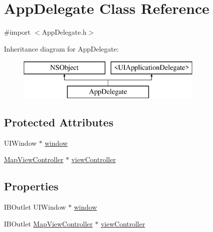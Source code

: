 \hypertarget{interface_app_delegate}{\section{App\-Delegate Class Reference}
\label{interface_app_delegate}
}


{\ttfamily \#import $<$App\-Delegate.\-h$>$}

Inheritance diagram for App\-Delegate\-:\begin{figure}[H]
\begin{center}
\leavevmode
\includegraphics[height=2.000000cm]{interface_app_delegate}
\end{center}
\end{figure}
\subsection*{Protected Attributes}
\begin{DoxyCompactItemize}
\item 
U\-I\-Window $\ast$ \hyperlink{interface_app_delegate_ae04748cdefebda525b266731b6c120a2}{window}
\item 
\hyperlink{interface_map_view_controller}{Map\-View\-Controller} $\ast$ \hyperlink{interface_app_delegate_aa22afbe0037987ac2757d6a5e84efd13}{view\-Controller}
\end{DoxyCompactItemize}
\subsection*{Properties}
\begin{DoxyCompactItemize}
\item 
I\-B\-Outlet U\-I\-Window $\ast$ \hyperlink{interface_app_delegate_a055d472434a4ee0b915c207957a400e1}{window}
\item 
I\-B\-Outlet \hyperlink{interface_map_view_controller}{Map\-View\-Controller} $\ast$ \hyperlink{interface_app_delegate_a5b5475af5a71e801e164575948f11239}{view\-Controller}
\end{DoxyCompactItemize}


